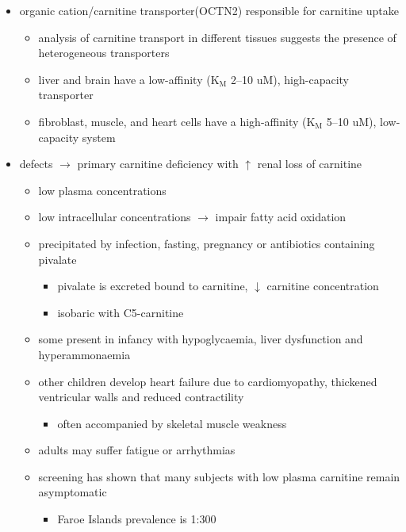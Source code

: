 \documentclass{scrartcl}
\begin{document}
\begin{itemize}
\item organic cation/carnitine transporter(OCTN2) responsible for
carnitine uptake
\begin{itemize}
\item analysis of carnitine transport in different tissues suggests the
presence of heterogeneous transporters
\item liver and brain have a low-affinity (K\(_{\text{M}}\) 2–10 uM), high-capacity transporter
\item fibroblast, muscle, and heart cells have a high-affinity (K\(_{\text{M}}\) 5–10 uM), low-capacity system
\end{itemize}
\item defects \(\to\) primary carnitine deficiency with \(\uparrow\) renal loss of carnitine
\begin{itemize}
\item low plasma concentrations
\item low intracellular concentrations \(\to\) impair fatty acid oxidation
\end{itemize}
\begin{itemize}
\item precipitated by infection, fasting, pregnancy or antibiotics containing pivalate
\begin{itemize}
\item pivalate is excreted bound to carnitine, \(\downarrow\) carnitine concentration
\item isobaric with C5-carnitine
\end{itemize}
\item some present in infancy with hypoglycaemia, liver dysfunction and hyperammonaemia
\item other children develop heart failure due to cardiomyopathy,
thickened ventricular walls and reduced contractility
\begin{itemize}
\item often accompanied by skeletal muscle weakness
\end{itemize}
\item adults may suffer fatigue or arrhythmias
\item screening has shown that many subjects with low plasma carnitine remain asymptomatic
\begin{itemize}
\item Faroe Islands prevalence is 1:300
\end{itemize}
\end{itemize}
\end{itemize}
\end{document}
